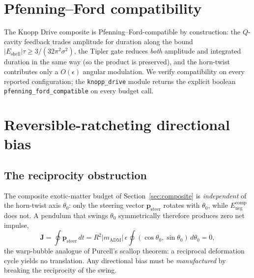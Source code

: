 \documentclass[11pt,a4paper]{article}
\begin{document}
\section{Pfenning--Ford compatibility}

The Knopp Drive composite is Pfenning--Ford-compatible by construction: the $Q$-cavity feedback trades amplitude for duration along the bound $|E_{\mathrm{shell}}|\tau\ge 3/(32\pi^{2}\sigma^{2})$, the Tipler gate reduces \emph{both} amplitude and integrated duration in the same way (so the product is preserved), and the horn-twist contributes only a $O(\epsilon)$ angular modulation. We verify compatibility on every reported configuration; the \texttt{knopp\_drive} module returns the explicit boolean \texttt{pfenning\_ford\_compatible} on every budget call.

\section{Reversible-ratcheting directional bias}\label{sec:bias}

\subsection{The reciprocity obstruction}
The composite exotic-matter budget of Section~\ref{sec:composite} is \emph{independent} of the horn-twist axis $\theta_{0}$: only the steering vector $\bm{p}_{\mathrm{steer}}$ rotates with $\theta_{0}$, while $E_{\mathrm{neg}}^{\mathrm{comp}}$ does not. A pendulum that swings $\theta_{0}$ symmetrically therefore produces zero net impulse,
\begin{equation}
\bm{J}=\oint \bm{p}_{\mathrm{steer}}\,dt = R^{2}|m_{\mathrm{ADM}}|\,\epsilon\oint(\cos\theta_{0},\sin\theta_{0})\,d\theta_{0}=0,
\end{equation}
the warp-bubble analogue of Purcell's scallop theorem: a reciprocal deformation cycle yields no translation. Any directional bias must be \emph{manufactured} by breaking the reciprocity of the swing.
\end{document}
